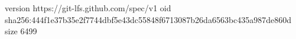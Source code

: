 version https://git-lfs.github.com/spec/v1
oid sha256:444f1e37b35e2f7744dbf5e43dc55848f6713087b26da6563bc435a987de860d
size 6499
